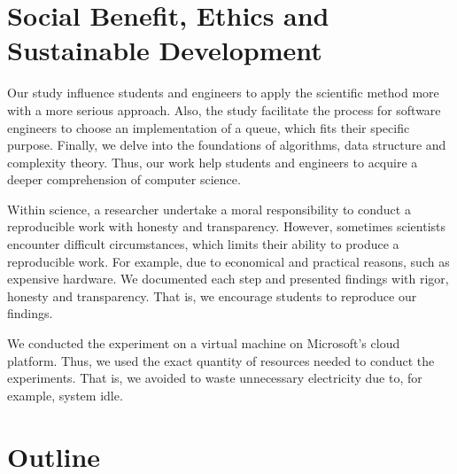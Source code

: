 \documentclass[a4paper,11pt]{kth-mag}
\newcommand*{\skippara}{\par\vspace{\baselineskip} \noindent}
\begin{document}
\section{Social Benefit, Ethics and Sustainable Development}
Our study influence students and engineers to apply the scientific method more with a more serious approach.
Also, the study facilitate the process for software engineers to choose an implementation of a queue, which fits their specific purpose.
Finally, we delve into the foundations of algorithms, data structure and complexity theory.
Thus, our work help students and engineers to acquire a deeper comprehension of computer science.

\skippara Within science, a researcher undertake a moral responsibility to conduct a reproducible work with honesty and transparency.
However, sometimes scientists encounter difficult circumstances, which limits their ability to produce a reproducible work.
For example, due to economical and practical reasons, such as expensive hardware.
We documented each step and presented findings with rigor, honesty and transparency.
That is, we encourage students to reproduce our findings.

\skippara We conducted the experiment on a virtual machine on Microsoft's cloud platform.
Thus, we used the exact quantity of resources needed to conduct the experiments.
That is, we avoided to waste unnecessary electricity due to, for example, system idle.



\section{Outline}




%
\end{document}
